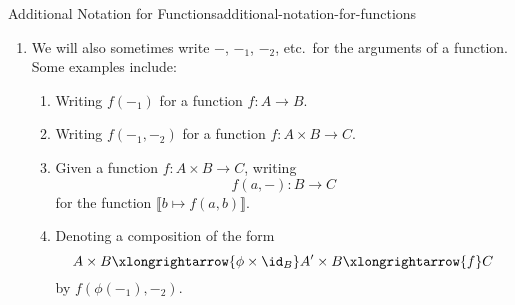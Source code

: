 \begin{notation}{Additional Notation for Functions}{additional-notation-for-functions}
\begin{enumerate}
\begin{enumerate}
\begin{enumerate}
                        \item\label{additional-notation-for-functions-2-c-ii}$[[x]\mapsto f([x])]$%
                        \item\label{additional-notation-for-functions-2-c-iii}$(\lambda[x].\ f([x]))$%
                    \end{enumerate}
                \item\label{additional-notation-for-functions-2-d}Function evaluations, cf.:
                    \begin{enumerate}
                        \item\label{additional-notation-for-functions-2-d-i}$\Phi(\llbracket x\mapsto f(x)\rrbracket)$%
                        \item\label{additional-notation-for-functions-2-d-ii}$\Phi((x\mapsto f(x)))$%
                        \item\label{additional-notation-for-functions-2-d-iii}$\Phi((\lambda x.\ f(x)))$%
                    \end{enumerate}
            \end{enumerate}
        \item\label{additional-notation-for-functions-3}We will also sometimes write $-$, $-_{1}$, $-_{2}$, etc.\ for the arguments of a function. Some examples include:
            \begin{enumerate}
                \item\label{additional-notation-for-functions-3-a}Writing $f(-_{1})$ for a function $f\colon A\to B$.
                \item\label{additional-notation-for-functions-3-b}Writing $f(-_{1},-_{2})$ for a function $f\colon A\times B\to C$.
                \item\label{additional-notation-for-functions-3-c}Given a function $f\colon A\times B\to C$, writing
                    \[
                        f(a,-)%
                        \colon%
                        B%
                        \to%
                        C%
                    \]%
                    for the function $\llbracket b\mapsto f(a,b)\rrbracket$.
                \item\label{additional-notation-for-functions-3-d}Denoting a composition of the form%
                    \[
                        A\times B%
                        \xlongrightarrow{\phi\times\id_{B}}%
                        A'\times B%
                        \xlongrightarrow{f}%
                        C%
                    \]%
                    by $f(\phi(-_{1}),-_{2})$.

\end{enumerate}
\end{enumerate}
\end{notation}

